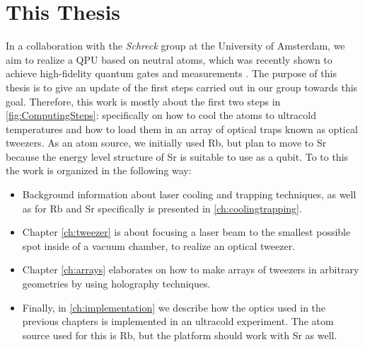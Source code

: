 \section{This Thesis}

In a collaboration with the \textit{Schreck} group at the University of Amsterdam, we aim to realize a \ac{QPU} based on neutral atoms, which was recently shown to achieve high-fidelity quantum gates and measurements \cite{Madjarov2020}. 
The purpose of this thesis is to give an update of the first steps carried out in our group towards this goal.
Therefore, this work is mostly about the first two steps in \cref{fig:ComputingSteps}: specifically on how to cool the atoms to ultracold temperatures and how to load them in an array of optical traps known as optical tweezers.
As an atom source, we initially used \ac{Rb}, but plan to move to \ac{Sr} because the energy level structure of Sr is suitable to use as a qubit. 
To to this the work is organized in the following way:

\begin{itemize}
	\setlength\itemsep{-1pt}
	\item Background information about laser cooling and trapping techniques, as well as for Rb and Sr specifically is presented in \cref{ch:coolingtrapping}. 

	\item Chapter \cref{ch:tweezer} is about focusing a laser beam to the smallest possible spot inside of a vacuum chamber, to realize an optical tweezer.

	\item Chapter \ref{ch:arrays} elaborates on how to make arrays of tweezers in arbitrary geometries by using holography techniques.

	\item Finally, in \cref{ch:implementation} we describe how the optics used in the previous chapters is implemented in an ultracold experiment. The atom source used for this is Rb, but the platform should work with Sr as well. 
\end{itemize}











